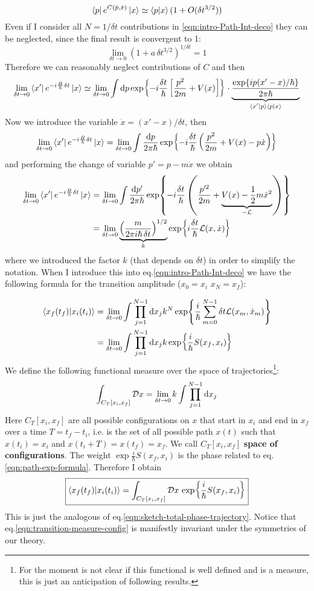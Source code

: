 \documentclass[../main/main.tex]{subfiles}
\begin{document}
\[\bra{p}e^{C(\hat p,\hat x)}\ket{x}\simeq\braket{p}{x}(1+O(\delta t^{3/2}))\]
Even if I consider all $N=1/\delta t$ contributions in \eqref{eqn:intro-Path-Int-deco} they can be neglected, since the final result is convergent to 1: 
\[\lim_{\delta t\to0}(1+a\,\delta t^{3/2})^{1/\delta t}=1\]
Therefore we can reasonably neglect contributions of $C$ and then
\[\lim_{\delta t\to0}\bra{x'}e^{-i\frac{\hat H}{\hbar}\delta t}\ket{x}
\simeq\lim_{\delta t\to0}\int\textup{d} p\exp{-i\frac{\delta t}{\hbar}\left[\frac{p^2}{2m}+V(x)\right]}\cdot\underbrace{\frac{\exp{i p(x'-x)/\hbar}}{2\pi\hbar}}_{\braket*{x'}{p}\braket{p}{x}}\]
Now we introduce the variable $\dot x=(x'-x)/\delta t$, then 
\[\lim_{\delta t\to0}\bra{x'}e^{-i\frac{\hat H}{\hbar}\delta t}\ket{x}
=\lim_{\delta t\to0}\int\frac{\textup{d} p}{2\pi\hbar}\exp{-i\frac{\delta t}{\hbar}\left(\frac{p^2}{2m}+V(x)-p\dot x\right)}\]
and performing the change of variable $p'=p-m\dot x$ we obtain
\begin{align*}
\lim_{\delta t\to0}\bra{x'}e^{-i\frac{\hat H}{\hbar}\delta t}\ket{x}
&=\lim_{\delta t\to0}\int\frac{\textup{d} p'}{2\pi\hbar}\exp{-i\frac{\delta t}{\hbar}\left(\frac{p'^2}{2m}+\underbrace{V(x)-\frac12m\dot x^2}_{-\mathcal L}\right)}\\
&=\lim_{\delta t\to0}\underbrace{\left(\frac{m}{2\pi i\hbar\,\delta t}\right)^{1/2}}_{k}\exp{i\frac{\delta t}{\hbar}\mathcal L(x,\dot x)}
\end{align*}
where we introduced the factor $k$ (that depends on $\delta t$) in order to simplify the notation. When I introduce this into eq.\eqref{eqn:intro-Path-Int-deco} we have the following formula for the transition amplitude ($x_0=x_i$ $x_N=x_f$):

\begin{align*}
\braket{x_f(t_f)}{x_i(t_i)}
&=\lim_{\delta t\to0}\int\prod_{j=1}^{N-1}\textup{d} x_j
k^N\exp{\frac{i}{\hbar}\sum_{m=0}^{N-1}\delta t\mathcal L(x_m,\dot x_m)}\\
&=\lim_{\delta t\to0}\int\prod_{j=1}^{N-1}\textup{d} x_j
k\exp{\frac{i}{\hbar}S(x_f,x_i)}
\end{align*}
We define the following functional measure over the space of trajectories\footnote{For the moment is not  clear if this functional is well defined and is a measure, this is just an anticipation of following results.}:
\[\int_{C_T[x_i,x_f]} \mathcal Dx = \lim_{\delta t\to0} k \int\prod_{j=1}^{N-1}\textup{d} x_j\]
Here $C_T[x_i,x_f]$ are all possible configurations on $x$ that start in $x_i$ and end in $x_f$ over a time $T=t_f-t_i$, i.e. is the set of all possible path $x(t)$ such that $x(t_i)=x_i$ and $x(t_i+T)=x(t_f)=x_f$. We call ${C_T[x_i,x_f]}$ \textbf{space of configurations}. The weight $\exp{\frac{i}{\hbar}S(x_f,x_i)}$ is the phase related to eq.\eqref{eqn:path-exp-formula}. Therefore I obtain
\begin{equation}\label{eqn:transition-measure-config}\boxed{
\braket{x_f(t_f)}{x_i(t_i)}=\int_{C_T[x_i,x_f]} \mathcal Dx\,\exp{\frac{i}{\hbar}S(x_f,x_i)}
}\end{equation}
This is just the analogous of eq.\eqref{eqn:sketch-total-phase-trajectory}. Notice that eq.\eqref{eqn:transition-measure-config} is manifestly invariant under the symmetries of our theory. 
\end{document}
